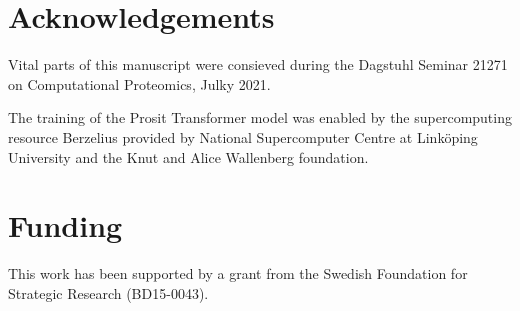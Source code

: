\documentclass[10pt,a4paper]{article}
\begin{document}
\section*{Acknowledgements}
Vital parts of this manuscript were consieved during the Dagstuhl Seminar 21271 on Computational Proteomics, Julky 2021. 

The training of the Prosit Transformer model was enabled by the supercomputing resource Berzelius provided by National Supercomputer Centre at Linköping University and the Knut and Alice Wallenberg foundation.

\section*{Funding}

This work has been supported by a grant from the Swedish Foundation for Strategic Research (BD15-0043).




\end{document}
